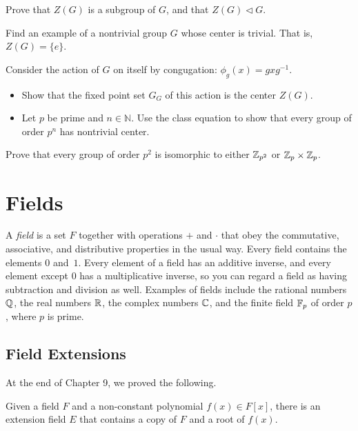 \begin{problem}
Prove that $Z(G)$ is a subgroup of $G$, and that $Z(G)\lhd G$.
\end{problem}

\begin{problem}
Find an example of a nontrivial group $G$ whose center is trivial.  That is, $Z(G) = \{e\}$.
\end{problem}



\begin{problem}
Consider the action of $G$ on itself by congugation: $\phi_g(x) = gxg^{-1}$.
\begin{itemize}
 \item Show that the fixed point set $G_G$ of this action is the center $Z(G)$.
 \item Let $p$ be prime and $n\in \mathbb{N}$.  Use the class equation to show that every group of order $p^n$ has nontrivial center.
\end{itemize}
\end{problem}



\begin{problem}
Prove that every group of order $p^2$ is isomorphic to either $\mathbb{Z}_{p^2}$ or $\mathbb{Z}_p\times \mathbb{Z}_p$.
\end{problem}

\chapter{Fields}

A \textit{field} is a set $F$ together with operations $+$ and $\cdot$ that obey the commutative, associative, and distributive properties in the usual way. Every field contains the elements $0$ and~$1$. Every element of a field has an additive inverse, and every element except $0$ has a multiplicative inverse, so you can regard a field as having subtraction and division as well. Examples of fields include the rational numbers $\mathbb{Q}$, the real numbers $\mathbb{R}$, the complex numbers $\mathbb{C}$, and the finite field $\mathbb{F}_p$ of order $p$, where $p$ is prime.

\section{Field Extensions}

At the end of Chapter 9, we proved the following.

\begin{theorem}\label{thm:fieldext}
    Given a field $F$ and a non-constant polynomial $f(x)
    \in F[x]$, there is an extension field $E$ that contains a copy of $F$ and a root of $f(x)$.
\end{theorem}

